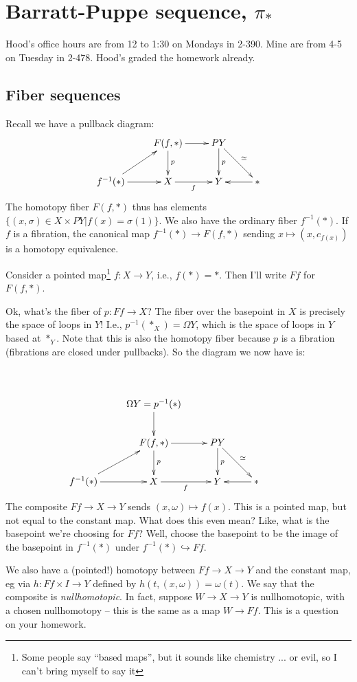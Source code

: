 \section{Barratt-Puppe sequence, $\pi_\ast$}
Hood's office hours are from 12 to 1:30 on Mondays in 2-390. Mine are from 4-5 on Tuesday in 2-478. Hood's graded the homework already.
\subsection{Fiber sequences}
Recall we have a pullback diagram:
\begin{equation*}
    \xymatrix{
	& F(f,\ast)\ar[r]\ar[d]^p & PY\ar[d]^p\ar[dr]^{\simeq} & \\
	f^{-1}(\ast)\ar[ur]\ar[r] & X\ar[r]_f & Y & \ast\ar[l]
    }
\end{equation*}
The homotopy fiber $F(f,\ast)$ thus has elements $\{(x,\sigma)\in X\times PY| f(x) = \sigma(1)\}$. We also have the ordinary fiber $f^{-1}(\ast)$. If $f$ is a fibration, the canonical map $f^{-1}(\ast)\to F(f,\ast)$ sending $x\mapsto(x,c_{f(x)})$ is a homotopy equivalence.
\begin{remark}
Consider a pointed map\footnote{Some people say ``based maps'', but it sounds like chemistry ... or evil, so I can't bring myself to say it} $f:X\to Y$, i.e., $f(\ast) = \ast$. Then I'll write $Ff$ for $F(f,\ast)$.
\end{remark}
Ok, what's the fiber of $p:Ff\to X$? The fiber over the basepoint in $X$ is precisely the space of loops in $Y$! I.e., $p^{-1}(\ast_X) = \Omega Y$, which is the space of loops in $Y$ based at $\ast_Y$. Note that this is also the homotopy fiber because $p$ is a fibration (fibrations are closed under pullbacks). So the diagram we now have is:
\begin{equation*}
\xymatrix{\\
    & \Omega Y=p^{-1}(\ast)\ar[d] & & &\\
    & F(f,\ast)\ar[r]\ar[d]^p & PY\ar[d]^p\ar[dr]^{\simeq} & \\
    f^{-1}(\ast)\ar[ur]\ar[r] & X\ar[r]_f & Y & \ast\ar[l]
}
\end{equation*}
The composite $Ff\to X\to Y$ sends $(x,\omega)\mapsto f(x)$. This is a pointed map, but not equal to the constant map. What does this even mean? Like, what is the basepoint we're choosing for $Ff$? Well, choose the basepoint to be the image of the basepoint in $f^{-1}(\ast)$ under $f^{-1}(\ast)\hookrightarrow Ff$.

We also have a (pointed!) homotopy between $Ff\to X\to Y$ and the constant map, eg via $h:Ff\times I\to Y$ defined by $h(t,(x,\omega)) = \omega(t)$. We say that the composite is \emph{nullhomotopic}. In fact, suppose $W\to X\to Y$ is nullhomotopic, with a chosen nullhomotopy -- this is the same as a map $W\to Ff$. This is a question on your homework.

